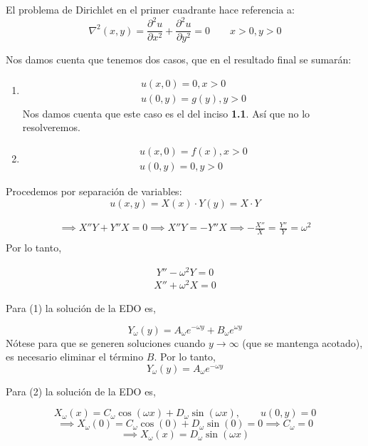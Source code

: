 \begin{solution}
El problema de Dirichlet en el primer cuadrante hace referencia a: 
$$\nabla^2(x,y)=\frac{\partial ^2 u}{\partial x^2}+\frac{\partial ^2 u}{\partial y^2}=0 \qquad x>0,y>0 $$
 
Nos damos cuenta que tenemos dos casos, que en el resultado final se sumarán: 

\begin{enumerate}
    \item $$\begin{array}{l}
u(x, 0)=0, x>0 \\
u(0, y)=g(y), y>0
\end{array}
$$ Nos damos cuenta que este caso es el del inciso \textbf{1.1}. Así que no lo resolveremos. 
\item $$\begin{array}{l}
u(x, 0)=f(x), x>0 \\
u(0, y)=0, y>0
\end{array}
$$

\end{enumerate}

\linea 

Procedemos por separación de variables: 
$$u(x,y)=X(x)\cdot Y(y)= X\cdot Y$$

\begin{gather*}
    \implies X''Y+Y''X = 0 \implies X''Y=-Y''X \implies -\frac{X''}{X} = \frac{Y''}{Y}=\omega^2\\
\end{gather*}
\setcounter{equation}{0}
Por lo tanto, 

\begin{gather}
     Y''-\omega^2 Y=0
\end{gather}
\begin{gather}
     X''+\omega^2 X=0 
\end{gather}


\linea 

Para (1) la solución de la EDO es, 

$$Y_\omega(y)= A_\omega e^{-\omega y}+ B_\omega e^{\omega y}$$
Nótese para que se generen soluciones cuando $y\to \infty$ (que se mantenga acotado), es necesario eliminar el término $B$. Por lo tanto, 
$$Y_\omega(y)= A_\omega e^{-\omega y}$$

\linea 

Para (2) la solución de la EDO es, 

$$X_\omega (x)= C_\omega \cos(\omega x)+D_\omega\sin(\omega x), \qquad u(0,y)=0$$
$$\implies X_\omega(0)= C_\omega\cos(0)+D_\omega\sin(0)=0\implies C_\omega=0$$
$$\implies X_\omega(x)=D_\omega\sin(\omega x)$$


\end{solution}
